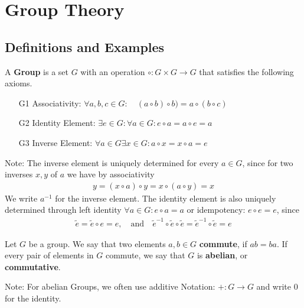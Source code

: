\section{Group Theory}

\subsection{Definitions and Examples}

\begin{definition}[Group]
	A \textbf{Group} is a set $G$ with an operation $\circ: G \times G \to G$ that satisfies the following axioms.
	\begin{enumerate}
		\item[G1]	Associativity: $\forall a,b,c \in G: \quad (a \circ b) \circ b) = a \circ (b \circ c)$
		\item[G2]	Identity Element: $\exists e \in G: \forall a \in  G: e \circ a = a \circ e = a$
		\item[G3] Inverse Element: $\forall a \in G \exists x \in G: a \circ x = x \circ a = e$
	\end{enumerate}
\end{definition}
Note: The inverse element is uniquely determined for every $a \in G$, since for two inverses $x,y$ of $a$ we have by associativity
\begin{align*}	
	y = (x \circ a) \circ y = x \circ (a \circ y) = x
\end{align*}
We write $a^{-1}$ for the inverse element. 
The identity element is also uniquely determined through left identity $\forall a \in G: e \circ a = a$ or idempotency: $e \circ e = e$, since 
\begin{align*}
	\tilde{e} = \tilde{e} \circ e = e, \quad \text{and} \quad \tilde{e}^{-1} \circ \tilde{e} \circ \tilde{e} = \tilde{e}^{-1} \circ \tilde{e} = e
\end{align*}

\begin{definition}
	Let $G$ be a group. We say that two elements $a,b \in G$ \textbf{commute}, if $ab = ba$. If every pair of elements in $G$ commute, we say that $G$ is \textbf{abelian}, or \textbf{commutative}.
\end{definition}
Note: For abelian Groups, we often use additive Notation: $+: G \to G$ and write $0$ for the identity.


